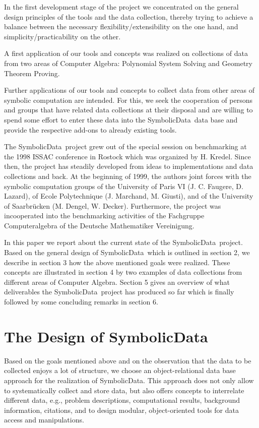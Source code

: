 \documentclass[11pt,a4paper]{article}
\newcommand{\SD}{{\sc Symbolic\-Data}}
\begin{document}
In the first development stage of the project we concentrated on the
general design principles of the tools and the data collection, thereby
trying to achieve a balance between the necessary
flexibility/extensibility on the one hand, and
simplicity/practicability on the other.

A first application of our tools and concepts was realized on
collections of data from two areas of Computer Algebra: 
Polynomial System Solving and Geometry Theorem Proving.

Further applications of our tools and concepts to collect data from
other areas of symbolic computation are intended. For this, we seek
the cooperation of persons and groups that have related data
collections at their disposal and are willing to spend some effort to
enter these data into the \SD\ data base and provide the respective
add-ons to already existing tools.
\medskip

The \SD\ project grew out of the special session on benchmarking at
the 1998 ISSAC conference in Rostock which was organized by H. Kredel.
Since then, the project has steadily developed from ideas to
implementations and data collections and back. At the beginning of
1999, the authors joint forces with the symbolic computation groups of
the University of Paris VI (J. C. Faugere, D.  Lazard), of Ecole
Polytechnique (J. Marchand, M. Giusti), and of the University of
Saarbr\"{u}cken (M. Dengel, W. Decker). Furthermore, the project was
incooperated into the benchmarking activities of the Fachgruppe
Computer\-algebra of the Deutsche Mathematiker Vereinigung.

In this paper we report about the current state of the \SD\ project.
Based on the general design of \SD\ which is outlined in section 2, we
describe in section 3 how the above mentioned goals were realized.
These concepts are illustrated in section 4 by two examples of data
collections from different areas of Computer Algebra. Section 5 gives
an overview of what deliverables the \SD\ project has produced so far
which is finally followed by some concluding remarks in section 6.

\section{The Design of \SD}

Based on the goals mentioned above and on the observation that the
data to be collected enjoys a lot of structure, we choose an
object-relational data base approach for the realization of \SD. This
approach does not only allow to systematically collect and store data,
but also offers concepts to interrelate different data, e.g., problem
descriptions, computational results, background information,
citations, and to design modular, object-oriented tools for data
access and manipulations.
\end{document}

